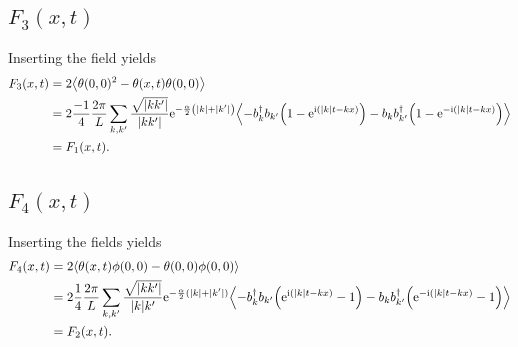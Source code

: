 \documentclass[english, parskip=full]{scrartcl}
\begin{document}
\subsection{$F_3(x,t)$}
Inserting the field yields
\begin{align}
F_3(x,t) &= 2\bra*{\theta(0,0)^2 - \theta(x,t)\theta(0,0)}\\
&= 2 \frac{-1}{4} \frac{2\pi}{L} \sum_{k,k'} \frac{\sqrt{|kk'|}}{|kk'|} \powe{-\frac{\alpha}{2} \kla*{|k| + |k'|}} \bra*{-b_k^\dagger b_{k'} \kla*{1 - \powe{\i (|k|t-kx)}} - b_k b_{k'}^\dagger \kla*{1 - \powe{-\i (|k|t-kx)}}} \\
&= F_1(x,t).
\end{align}
\subsection{$F_4(x,t)$}
Inserting the fields yields
\begin{align}
F_4(x,t) &= 2\bra*{\theta(x,t)\phi(0,0) - \theta(0,0)\phi(0,0)}\\
&= 2 \frac{1}{4} \frac{2\pi}{L} \sum_{k,k'} \frac{\sqrt{|kk'|}}{|k|k'} \powe{-\frac{\alpha}{2} (|k|+|k'|)} \bra*{-b_k^\dagger b_{k'} \kla*{\powe{\i (|k|t - kx)} - 1} - b_k b_{k'}^\dagger \kla*{\powe{-\i (|k|t - kx)} - 1}}\\
&= F_2(x,t).
\end{align}
\end{document}
